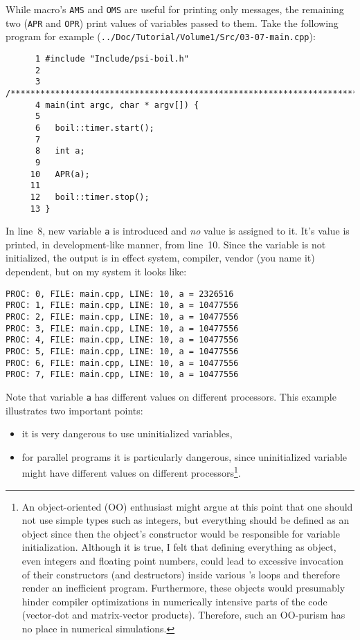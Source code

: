 While macro's {\tt AMS} and {\tt OMS} are useful for printing only
messages, the remaining two ({\tt APR} and {\tt OPR}) print values of
variables passed to them. Take the following program for example
({\tt ../Doc/Tutorial/Volume1/Src/03-07-main.cpp}):
%
{\small \begin{verbatim}
      1 #include "Include/psi-boil.h"
      2
      3 /****************************************************************************/
      4 main(int argc, char * argv[]) {
      5
      6   boil::timer.start();
      7
      8   int a;
      9
     10   APR(a);
     11
     12   boil::timer.stop();
     13 }
\end{verbatim}}
%
In line~8, new variable {\tt a} is introduced and {\em no} value is assigned 
to it. It's value is printed, in development-like manner, from line~10.
Since the variable is not initialized, the output is in effect system,
compiler, vendor (you name it) dependent, but on my system it looks like:
%
{\small \begin{verbatim}
PROC: 0, FILE: main.cpp, LINE: 10, a = 2326516
PROC: 1, FILE: main.cpp, LINE: 10, a = 10477556
PROC: 2, FILE: main.cpp, LINE: 10, a = 10477556
PROC: 3, FILE: main.cpp, LINE: 10, a = 10477556
PROC: 4, FILE: main.cpp, LINE: 10, a = 10477556
PROC: 5, FILE: main.cpp, LINE: 10, a = 10477556
PROC: 6, FILE: main.cpp, LINE: 10, a = 10477556
PROC: 7, FILE: main.cpp, LINE: 10, a = 10477556
\end{verbatim}}
%
Note that variable {\tt a} has different values on different processors. This
example illustrates two important points:
%
\begin{itemize}
  \item it is very dangerous to use uninitialized variables,
  \item for parallel programs it is particularly dangerous, since uninitialized
        variable might have different values on different processors\footnote{
An object-oriented (OO) enthusiast might argue at this point that one should not
use simple types such as integers, but everything should be defined as an object
since then the object's constructor would be responsible for variable 
initialization. Although it is true, I felt that defining everything as object,
even integers and floating point numbers, could lead to excessive invocation of
their constructors (and destructors) inside various {\psiboil}'s loops
and therefore render an inefficient program. Furthermore, these objects would
presumably hinder compiler optimizations in numerically intensive parts of the 
code (vector-dot and matrix-vector products). Therefore, such an OO-purism has 
no place in numerical simulations.}.
\end{itemize}
%

